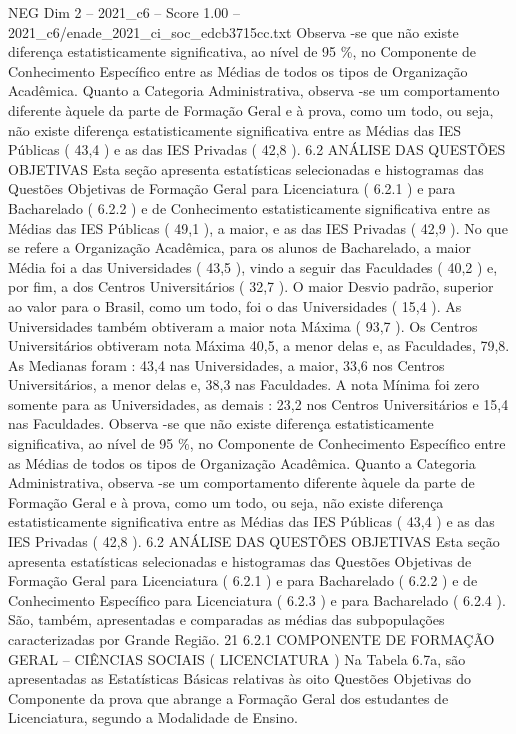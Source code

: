 \begin{textsample}{NEG Dim 2 – 2021\_c6 – Score 1.00 – 2021\_c6/enade\_2021\_ci\_soc\_edcb3715cc.txt}
Observa -se que não existe diferença estatisticamente significativa, ao nível de 95 \%, no Componente de Conhecimento Específico entre as Médias de todos os tipos de Organização Acadêmica.
Quanto a Categoria Administrativa, observa -se um comportamento diferente àquele da parte de Formação Geral e à prova, como um todo, ou seja, não existe diferença estatisticamente significativa entre as Médias das IES Públicas ( 43,4 ) e as das IES Privadas ( 42,8 ). 6.2 ANÁLISE DAS QUESTÕES OBJETIVAS Esta seção apresenta estatísticas selecionadas e histogramas das Questões Objetivas de Formação Geral para Licenciatura ( 6.2.1 ) e para Bacharelado ( 6.2.2 ) e de Conhecimento estatisticamente significativa entre as Médias das IES Públicas ( 49,1 ), a maior, e as das IES Privadas ( 42,9 ).
No que se refere a Organização Acadêmica, para os alunos de Bacharelado, a maior Média foi a das Universidades ( 43,5 ), vindo a seguir das Faculdades ( 40,2 ) e, por fim, a dos Centros Universitários ( 32,7 ).
O maior Desvio padrão, superior ao valor para o Brasil, como um todo, foi o das Universidades ( 15,4 ).
As Universidades também obtiveram a maior nota Máxima ( 93,7 ).
Os Centros Universitários obtiveram nota Máxima 40,5, a menor delas e, as Faculdades, 79,8.
As Medianas foram : 43,4 nas Universidades, a maior, 33,6 nos Centros Universitários, a menor delas e, 38,3 nas Faculdades.
A nota Mínima foi zero somente para as Universidades, as demais : 23,2 nos Centros Universitários e 15,4 nas Faculdades.
Observa -se que não existe diferença estatisticamente significativa, ao nível de 95 \%, no Componente de Conhecimento Específico entre as Médias de todos os tipos de Organização Acadêmica.
Quanto a Categoria Administrativa, observa -se um comportamento diferente àquele da parte de Formação Geral e à prova, como um todo, ou seja, não existe diferença estatisticamente significativa entre as Médias das IES Públicas ( 43,4 ) e as das IES Privadas ( 42,8 ). 6.2 ANÁLISE DAS QUESTÕES OBJETIVAS Esta seção apresenta estatísticas selecionadas e histogramas das Questões Objetivas de Formação Geral para Licenciatura ( 6.2.1 ) e para Bacharelado ( 6.2.2 ) e de Conhecimento Específico para Licenciatura ( 6.2.3 ) e para Bacharelado ( 6.2.4 ).
São, também, apresentadas e comparadas as médias das subpopulações caracterizadas por Grande Região. 21 6.2.1 COMPONENTE DE FORMAÇÃO GERAL – CIÊNCIAS SOCIAIS ( LICENCIATURA ) Na Tabela 6.7a, são apresentadas as Estatísticas Básicas relativas às oito Questões Objetivas do Componente da prova que abrange a Formação Geral dos estudantes de Licenciatura, segundo a Modalidade de Ensino.

\end{textsample}
